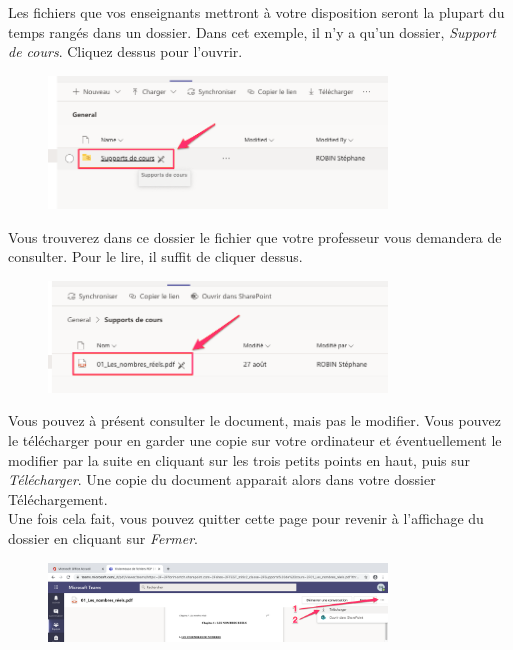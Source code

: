 Les fichiers que vos enseignants mettront à votre disposition seront la plupart du temps rangés dans un dossier. Dans cet exemple, il n'y a qu'un dossier, \textit{Support de cours}. Cliquez dessus pour l'ouvrir.

\begin{figure}[H]
	\includegraphics[width=9cm]{./images/teams/ouvrir_dossier_crop}
	\centering
\end{figure}

Vous trouverez dans ce dossier le fichier que votre professeur vous demandera de consulter. Pour le lire, il suffit de cliquer dessus.

\begin{figure}[H]
	\includegraphics[width=9cm]{./images/teams/ouvrir_fichier_crop}
	\centering
\end{figure}

Vous pouvez à présent consulter le document, mais pas le modifier. Vous pouvez le télécharger pour en garder une copie sur votre ordinateur et éventuellement le modifier par la suite en cliquant sur les trois petits points en haut, puis sur \textit{Télécharger}. Une copie du document apparait alors dans votre dossier Téléchargement.\\

Une fois cela fait, vous pouvez quitter cette page pour revenir à l'affichage du dossier en cliquant sur \textit{Fermer}.
\newpage
\begin{figure}[H]
	\includegraphics[width=9cm]{./images/teams/telecharger_document_crop}
	\centering
\end{figure}

